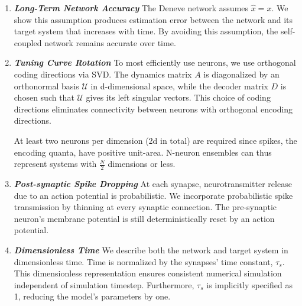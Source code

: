 \begin{enumerate}
    \item \textbf{\textit{Long-Term Network Accuracy}} The Deneve network assumes $\hat{x}=x$. We show this assumption produces estimation error between the network and its target system that increases with time. By avoiding this assumption, the self-coupled network remains accurate over time. 
    
    \item \textbf{\textit{Tuning Curve Rotation}} To most efficiently use neurons, we use orthogonal coding directions via SVD. The dynamics matrix $A$ is diagonalized by an orthonormal basis $\mathcal{U}$ in d-dimensional space, while the decoder matrix $D$ is chosen such that $\mathcal{U}$ gives its left singular vectors. This choice of coding directions eliminates connectivity between neurons with orthogonal encoding directions.
    
 	    
	At least two neurons per dimension (2d in total) are required since spikes, the encoding quanta, have positive unit-area.
    N-neuron ensembles can thus represent systems with $\frac{N}{2}$ dimensions or less. 
    
    \item \textbf{\textit{Post-synaptic Spike Dropping}} At each synapse, neurotransmitter release due to an action potential is probabilistic.  We incorporate probabilistic spike transmission by thinning at every synaptic connection. The pre-synaptic neuron's membrane potential is still deterministically reset by an action potential. 
    
    \item \textbf{\textit{Dimensionless Time}} We describe both the network and target system in dimensionless time. Time is normalized by the synapses' time constant, $\tau_s$. This dimensionless representation ensures consistent numerical simulation independent of simulation timestep. Furthermore, $\tau_s$ is implicitly specified as 1, reducing the model's parameters by one.     
\end{enumerate}

